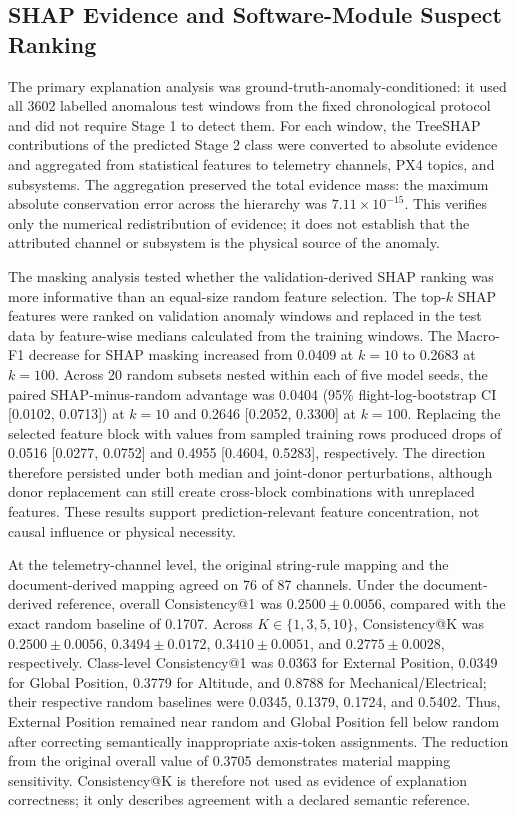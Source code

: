 \subsection{SHAP Evidence and Software-Module Suspect Ranking}

The primary explanation analysis was ground-truth-anomaly-conditioned: it used all 3602 labelled anomalous test windows from the fixed chronological protocol and did not require Stage 1 to detect them. For each window, the TreeSHAP contributions of the predicted Stage 2 class were converted to absolute evidence and aggregated from statistical features to telemetry channels, PX4 topics, and subsystems. The aggregation preserved the total evidence mass: the maximum absolute conservation error across the hierarchy was $7.11 \times 10^{-15}$. This verifies only the numerical redistribution of evidence; it does not establish that the attributed channel or subsystem is the physical source of the anomaly.

The masking analysis tested whether the validation-derived SHAP ranking was more informative than an equal-size random feature selection. The top-$k$ SHAP features were ranked on validation anomaly windows and replaced in the test data by feature-wise medians calculated from the training windows. The Macro-F1 decrease for SHAP masking increased from 0.0409 at $k=10$ to 0.2683 at $k=100$. Across 20 random subsets nested within each of five model seeds, the paired SHAP-minus-random advantage was 0.0404 (95\% flight-log-bootstrap CI [0.0102, 0.0713]) at $k=10$ and 0.2646 [0.2052, 0.3300] at $k=100$. Replacing the selected feature block with values from sampled training rows produced drops of 0.0516 [0.0277, 0.0752] and 0.4955 [0.4604, 0.5283], respectively. The direction therefore persisted under both median and joint-donor perturbations, although donor replacement can still create cross-block combinations with unreplaced features. These results support prediction-relevant feature concentration, not causal influence or physical necessity.

At the telemetry-channel level, the original string-rule mapping and the document-derived mapping agreed on 76 of 87 channels. Under the document-derived reference, overall Consistency@1 was $0.2500 \pm 0.0056$, compared with the exact random baseline of 0.1707. Across $K \in \{1,3,5,10\}$, Consistency@K was $0.2500 \pm 0.0056$, $0.3494 \pm 0.0172$, $0.3410 \pm 0.0051$, and $0.2775 \pm 0.0028$, respectively. Class-level Consistency@1 was 0.0363 for External Position, 0.0349 for Global Position, 0.3779 for Altitude, and 0.8788 for Mechanical/Electrical; their respective random baselines were 0.0345, 0.1379, 0.1724, and 0.5402. Thus, External Position remained near random and Global Position fell below random after correcting semantically inappropriate axis-token assignments. The reduction from the original overall value of 0.3705 demonstrates material mapping sensitivity. Consistency@K is therefore not used as evidence of explanation correctness; it only describes agreement with a declared semantic reference.

